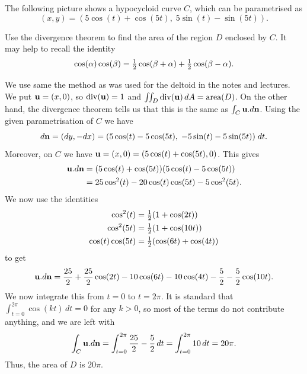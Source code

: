 \documentclass[a4paper]{amsart}
\renewenvironment{solution}{\SolutionInline}{\endSolutionInline}
\begin{document}
\begin{exercise}
 The following picture shows a hypocycloid curve $C$, which can be
 parametrised as
 \[ (x,y) = (5\cos(t)+\cos(5t),\;5\sin(t)-\sin(5t)). \]
 \begin{center}
 \end{center}
 Use the divergence theorem to find the area of the region $D$
 enclosed by $C$.  It may help to recall the identity
 \[ \cos(\alpha)\cos(\beta) = \tfrac{1}{2}\cos(\beta+\alpha) + \tfrac{1}{2}\cos(\beta-\alpha). \]
\end{exercise}
\begin{solution}
 We use same the method as was used for the deltoid in the notes and
 lectures.  We put $\mathbf{u}=(x,0)$, so $\operatorname{div}(\mathbf{u})=1$ and
 $\iint_D\operatorname{div}(\mathbf{u})\,dA=\text{area}(D)$.  On the other hand, the
 divergence theorem tells us that this is the same as
 $\int_C\mathbf{u}.d\mathbf{n}$.  Using the given parametrisation of $C$ we have 
 \[ d\mathbf{n} = (dy,-dx) = 
     (5\cos(t)-5\cos(5t),\;-5\sin(t)-5\sin(5t))\;dt.
 \]
 Moreover, on $C$ we have $\mathbf{u}=(x,0)=(5\cos(t)+\cos(5t),0)$.  This
 gives 
 \begin{align*}
  \mathbf{u}.d\mathbf{n} &= (5\cos(t)+\cos(5t))(5\cos(t)-5\cos(5t)) \\
   &= 25\cos^2(t)-20\cos(t)\cos(5t)-5\cos^2(5t).
 \end{align*}
 We now use the identities
 \begin{align*}
  \cos^2(t) &= \tfrac{1}{2}(1+\cos(2t)) \\
  \cos^2(5t) &= \tfrac{1}{2}(1+\cos(10t)) \\
  \cos(t)\cos(5t) &= \tfrac{1}{2}(\cos(6t)+\cos(4t))
 \end{align*}
 to get 
 \[ \mathbf{u}.d\mathbf{n} =
     \frac{25}{2} + \frac{25}{2}\cos(2t) - 
     10\cos(6t) - 10 \cos(4t) - \frac{5}{2} 
     - \frac{5}{2}\cos(10t).
 \]
 We now integrate this from $t=0$ to $t=2\pi$.  It is standard that
 $\int_{t=0}^{2\pi}\cos(kt)\,dt=0$ for any $k>0$, so most of the terms
 do not contribute anything, and we are left with 
 \[ \int_C\mathbf{u}.d\mathbf{n} = \int_{t=0}^{2\pi} \frac{25}{2} - \frac{5}{2}\, dt
      = \int_{t=0}^{2\pi} 10\,dt = 20\pi.
 \]
 Thus, the area of $D$ is $20\pi$. 
\end{solution}
\end{document}
